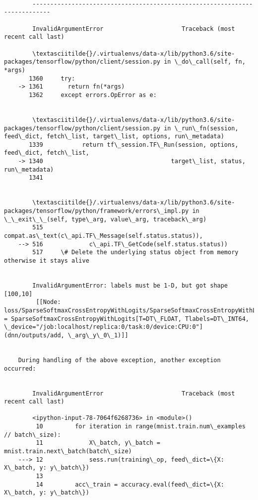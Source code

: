 \documentclass[11pt]{article}
\begin{document}
    \begin{Verbatim}[commandchars=\\\{\}]

        ---------------------------------------------------------------------------

        InvalidArgumentError                      Traceback (most recent call last)

        \textasciitilde{}/.virtualenvs/data-x/lib/python3.6/site-packages/tensorflow/python/client/session.py in \_do\_call(self, fn, *args)
       1360     try:
    -> 1361       return fn(*args)
       1362     except errors.OpError as e:


        \textasciitilde{}/.virtualenvs/data-x/lib/python3.6/site-packages/tensorflow/python/client/session.py in \_run\_fn(session, feed\_dict, fetch\_list, target\_list, options, run\_metadata)
       1339           return tf\_session.TF\_Run(session, options, feed\_dict, fetch\_list,
    -> 1340                                    target\_list, status, run\_metadata)
       1341 


        \textasciitilde{}/.virtualenvs/data-x/lib/python3.6/site-packages/tensorflow/python/framework/errors\_impl.py in \_\_exit\_\_(self, type\_arg, value\_arg, traceback\_arg)
        515             compat.as\_text(c\_api.TF\_Message(self.status.status)),
    --> 516             c\_api.TF\_GetCode(self.status.status))
        517     \# Delete the underlying status object from memory otherwise it stays alive


        InvalidArgumentError: labels must be 1-D, but got shape [100,10]
    	 [[Node: loss/SparseSoftmaxCrossEntropyWithLogits/SparseSoftmaxCrossEntropyWithLogits = SparseSoftmaxCrossEntropyWithLogits[T=DT\_FLOAT, Tlabels=DT\_INT64, \_device="/job:localhost/replica:0/task:0/device:CPU:0"](dnn/outputs/add, \_arg\_y\_0\_1)]]

        
    During handling of the above exception, another exception occurred:


        InvalidArgumentError                      Traceback (most recent call last)

        <ipython-input-78-7064f6268736> in <module>()
         10         for iteration in range(mnist.train.num\_examples // batch\_size):
         11             X\_batch, y\_batch = mnist.train.next\_batch(batch\_size)
    ---> 12             sess.run(training\_op, feed\_dict=\{X: X\_batch, y: y\_batch\})
         13 
         14         acc\_train = accuracy.eval(feed\_dict=\{X: X\_batch, y: y\_batch\})



\end{Verbatim}
\end{document}
